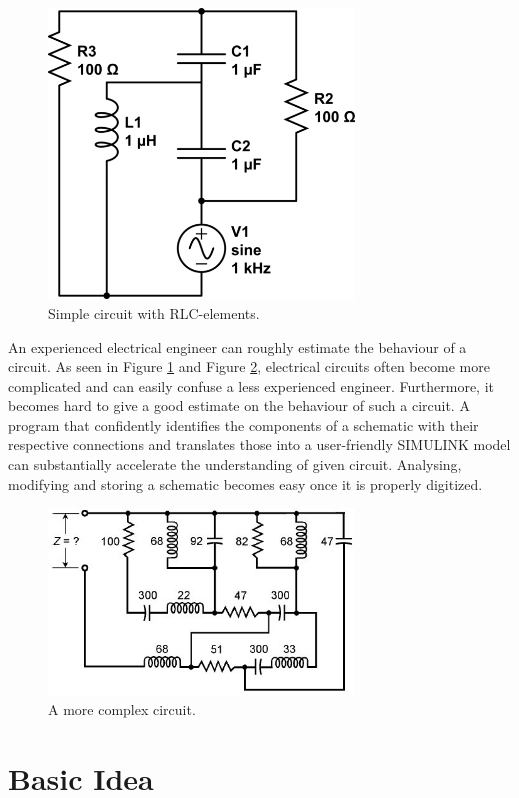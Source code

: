 \documentclass[10pt,twocolumn,letterpaper]{article}
\begin{document}
\begin{figure}[!ht]
\includegraphics[width = 3.2in]{circ1.png}
\caption{Simple circuit with RLC-elements.}
\label{fig:circ1}
\end{figure}

An experienced electrical engineer can roughly estimate the behaviour of a circuit. As seen in Figure \ref{fig:circ1} and Figure \ref{fig:circ2}, electrical circuits often become more complicated and can easily confuse a less experienced engineer. Furthermore, it becomes hard to give a good estimate on the behaviour of such a circuit.
A program that confidently identifies the components of a schematic with their respective connections and translates those into a user-friendly SIMULINK model can substantially accelerate the understanding of given circuit. Analysing, modifying and storing a schematic becomes easy once it is properly digitized.

\begin{figure}[!ht]
\includegraphics[width = 3.2in]{circ2.png}
\caption{A more complex circuit.}
\label{fig:circ2}
\end{figure}


\section{Basic Idea}
\label{sec:basic}
\end{document}
